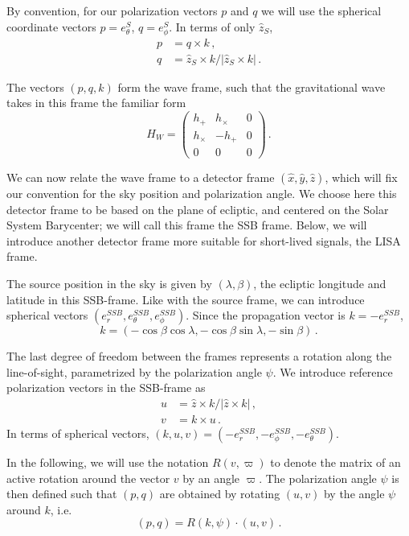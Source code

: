 \documentclass[aps,showpacs,twocolumn,prd,superscriptaddress,nofootinbib]{revtex4-1}
\newcommand{\be}{\begin{equation}}
\newcommand{\ee}{\end{equation}}
\newcommand{\bsub}{\begin{subequations}}
\newcommand{\esub}{\end{subequations}}
\begin{document}
By convention, for our polarization vectors $p$ and $q$ we will use the spherical coordinate vectors $p = e_{\theta}^{S}$, $q = e_{\phi}^{S}$. In terms of only $\hat{z}_{S}$,
\bsub
\begin{align}
	p &= q \times k \,,\\
	q &= \hat{z}_{S} \times k / |\hat{z}_{S} \times k|\,.
\end{align}
\esub

The vectors $(p,q,k)$ form the wave frame, such that the gravitational wave takes in this frame the familiar form
\be
	H_{W} = \begin{pmatrix}
		h_{+} & h_{\times} & 0 \\
		h_{\times} & -h_{+} & 0 \\
		0 & 0 & 0
		\end{pmatrix} \,.
\ee

We can now relate the wave frame to a detector frame $(\hat{x}, \hat{y}, \hat{z})$, which will fix our convention for the sky position and polarization angle. We choose here this detector frame to be based on the plane of ecliptic, and centered on the Solar System Barycenter; we will call this frame the SSB frame. Below, we will introduce another detector frame more suitable for short-lived signals, the LISA frame.

The source position in the sky is given by $(\lambda, \beta)$, the ecliptic longitude and latitude in this SSB-frame. Like with the source frame, we can introduce spherical vectors $(e_{r}^{SSB}, e_{\theta}^{SSB}, e_{\phi}^{SSB})$. Since the propagation vector is $k = - e_{r}^{SSB}$,
\be
	k = (- \cos\beta\cos\lambda, - \cos\beta\sin\lambda, -\sin\beta) \,.
\ee

The last degree of freedom between the frames represents a rotation along the line-of-sight, parametrized by the polarization angle $\psi$. We introduce reference polarization vectors in the SSB-frame as
\bsub
\begin{align}
	u &= \hat{z} \times k / |\hat{z} \times k| \,,\\
	v &= k \times u \,.
\end{align}
\esub
In terms of spherical vectors, $(k, u, v) = (-e_{r}^{SSB}, -e_{\phi}^{SSB}, -e_{\theta}^{SSB})$.

In the following, we will use the notation $R(v,\varpi)$ to denote the matrix of an active rotation around the vector $v$ by an angle $\varpi$. The polarization angle $\psi$ is then defined such that $(p,q)$ are obtained by rotating $(u,v)$ by the angle $\psi$ around $k$, i.e.
\be
	(p,q) = R(k, \psi) \cdot (u,v) \,.
\ee
\end{document}
